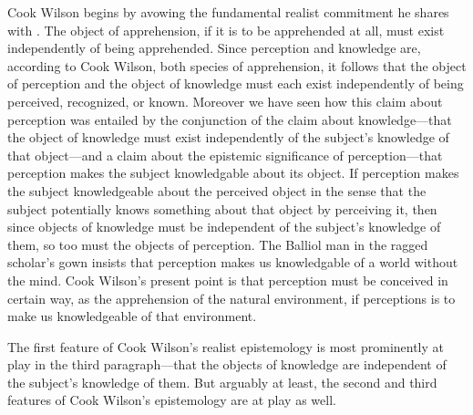 \documentclass[12pt]{article}
\begin{document}
Cook Wilson begins by avowing the fundamental realist commitment he shares with \citet{Moore:1903uo}. The object of apprehension, if it is to be apprehended at all, must exist independently of being apprehended. Since perception and knowledge are, according to Cook Wilson, both species of apprehension, it follows that the object of perception and the object of knowledge must each exist independently of being perceived, recognized, or known. Moreover we have seen how this claim about perception was entailed by the conjunction of the claim about knowledge---that the object of knowledge must exist independently of the subject's knowledge of that object---and a claim about the epistemic significance of perception---that perception makes the subject knowledgable about its object. If perception makes the subject knowledgeable about the perceived object in the sense that the subject potentially knows something about that object by perceiving it, then since objects of knowledge must be independent of the subject's knowledge of them, so too must the objects of perception. The Balliol man in the ragged scholar's gown insists that perception makes us knowledgable of a world without the mind. Cook Wilson's present point is that perception must be conceived in certain way, as the apprehension of the natural environment, if perceptions is to make us knowledgeable of that environment.

The first feature of Cook Wilson's realist epistemology is most prominently at play in the third paragraph---that the objects of knowledge are independent of the subject's knowledge of them. But arguably at least, the second and third features of Cook Wilson's epistemology are at play as well. 
\end{document}
